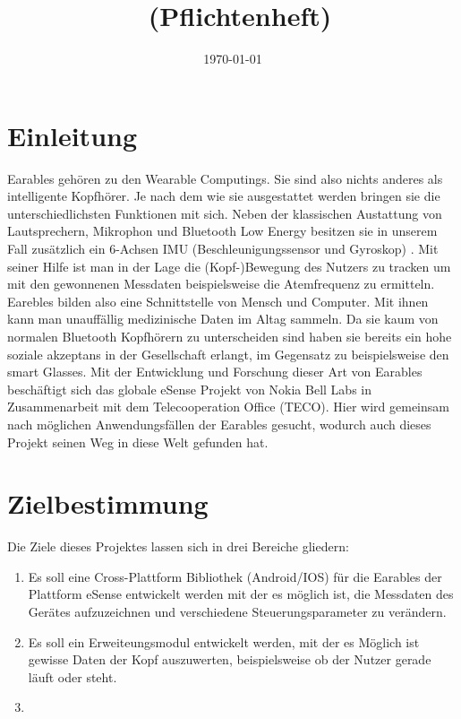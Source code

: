 \documentclass[a4paper,12pt]{article}
\title{\projektName~(Pflichtenheft)}
\author{\authorName}
\date{\today}
\begin{document}
 \setcounter{page}{2}
 \tableofcontents          %
 \clearpage

\section{Einleitung}
Earables gehören zu den Wearable Computings. Sie sind also nichts anderes als intelligente Kopfhörer. Je nach dem wie sie ausgestattet werden bringen sie die unterschiedlichsten Funktionen mit sich. Neben der klassischen Austattung von  Lautsprechern, Mikrophon und Bluetooth Low Energy besitzen sie in unserem Fall zusätzlich ein 6-Achsen IMU (Beschleunigungssensor und Gyroskop) . Mit seiner Hilfe ist man in der Lage die (Kopf-)Bewegung des Nutzers zu tracken um mit den gewonnenen Messdaten  beispielsweise die Atemfrequenz zu ermitteln. Earebles bilden also eine Schnittstelle von Mensch und Computer. Mit ihnen kann man unauffällig medizinische Daten im Altag sammeln. Da sie kaum von normalen Bluetooth Kopfhörern zu unterscheiden sind haben sie bereits ein hohe soziale akzeptans in der Gesellschaft erlangt, im Gegensatz zu beispielsweise den smart Glasses. Mit der Entwicklung und Forschung dieser Art von Earables beschäftigt sich das globale eSense Projekt von Nokia Bell Labs in Zusammenarbeit mit dem Telecooperation Office (TECO). Hier wird gemeinsam nach möglichen Anwendungsfällen der Earables gesucht, wodurch auch dieses Projekt seinen Weg in diese Welt gefunden hat.
\section{Zielbestimmung}
Die Ziele dieses Projektes lassen sich in drei Bereiche gliedern:
\begin{enumerate}

  \item Es soll eine Cross-Plattform Bibliothek (Android/IOS) für die Earables der Plattform eSense entwickelt werden mit der es möglich ist, die Messdaten des Gerätes aufzuzeichnen und verschiedene Steuerungsparameter zu verändern.
  
  \item Es soll ein Erweiteungsmodul entwickelt werden, mit der es Möglich ist gewisse Daten der Kopf auszuwerten, beispielsweise ob der Nutzer gerade läuft oder steht.
  
  \item %

\end{enumerate}
\end{document}
